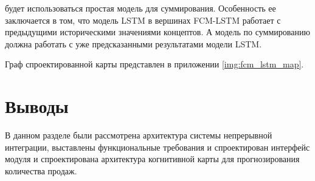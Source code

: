 \noindent будет использоваться простая модель для суммирования.
Особенность ее заключается в том, что модель LSTM в вершинах FCM-LSTM работает
с предыдущими историческими значениями концептов. А модель по суммированию должна работать
с уже предсказанными результатами модели LSTM.

Граф спроектированной карты представлен в приложении \ref{img:fcm_lstm_map}.

\section{Выводы}

В данном разделе были рассмотрена архитектура системы
непрерывной интеграции, выставлены функциональные требования
и спроектирован интерфейс модуля и спроектирована архитектура
когнитивной карты для прогнозирования количества продаж.